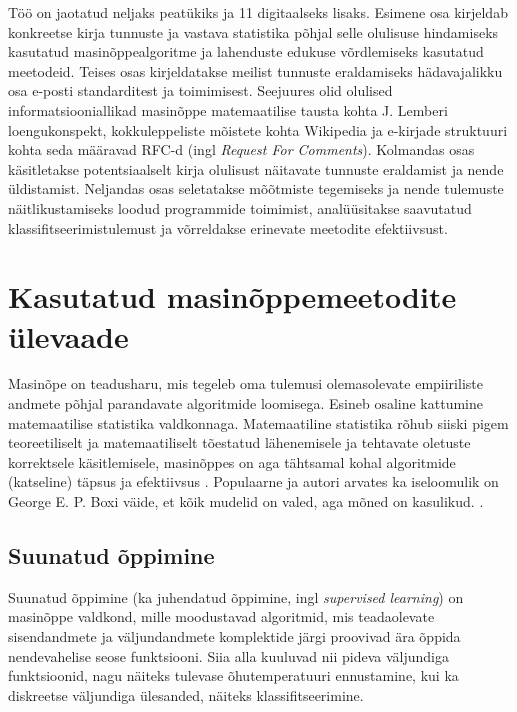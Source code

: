 \documentclass[]{trkuur}
\let\eng\emph
\begin{document}
Töö on jaotatud neljaks peatükiks ja 11 digitaalseks lisaks. 
Esimene osa kirjeldab konkreetse kirja tunnuste ja vastava statistika põhjal selle
olulisuse hindamiseks kasutatud masinõppealgoritme ja lahenduste edukuse
võrdlemiseks kasutatud meetodeid. Teises osas kirjeldatakse meilist tunnuste
eraldamiseks hädavajalikku osa e-posti standarditest ja toimimisest. Seejuures
olid olulised informatsiooniallikad masinõppe matemaatilise tausta kohta J.
Lemberi loengukonspekt, kokkuleppeliste mõistete kohta Wikipedia ja
e-kirjade struktuuri
kohta seda määravad RFC-d (ingl \eng{Request For Comments}).
Kolmandas osas käsitletakse potentsiaalselt kirja olulisust näitavate tunnuste
eraldamist ja nende üldistamist.
 Neljandas osas seletatakse mõõtmiste tegemiseks ja nende tulemuste näitlikustamiseks loodud
programmide toimimist, analüüsitakse saavutatud klassifitseerimistulemust ja
võrreldakse erinevate meetodite efektiivsust.
% 


\chapter{Kasutatud masinõppemeetodite ülevaade}
Masinõpe on teadusharu, mis tegeleb oma tulemusi olemasolevate empiiriliste
andmete põhjal parandavate algoritmide loomisega. Esineb osaline kattumine
matemaatilise statistika valdkonnaga. Matemaatiline statistika rõhub siiski pigem
teoreetiliselt ja matemaatiliselt tõestatud lähenemisele ja tehtavate oletuste
korrektsele käsitlemisele, masinõppes on aga tähtsamal kohal algoritmide (katseline)
täpsus ja efektiivsus \autocite{statsVsML}. Populaarne
ja autori arvates ka iseloomulik on George E. P. Boxi väide, et kõik mudelid on 
valed, aga mõned on kasulikud. \autocite{SXcvStatsQuote}.

\section{Suunatud õppimine}
Suunatud õppimine (ka juhendatud õppimine, ingl \eng{supervised learning}) on
masinõppe valdkond, mille moodustavad algoritmid, mis teadaolevate sisendandmete ja väljundandmete
komplektide järgi proovivad ära õppida nendevahelise seose funktsiooni. Siia
alla kuuluvad nii pideva väljundiga funktsioonid, nagu näiteks tulevase
õhutemperatuuri ennustamine, kui ka diskreetse väljundiga ülesanded, näiteks
klassifitseerimine.
\end{document}
